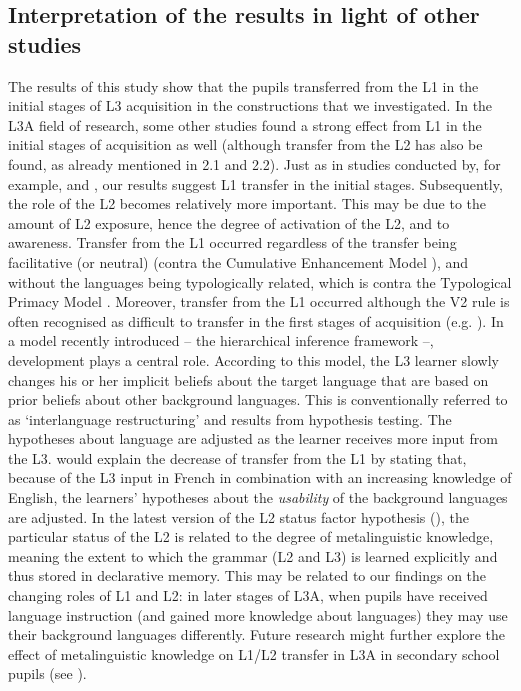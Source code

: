 \documentclass[output=paper,modfonts,nonflat, newtxmath]{langsci/langscibook}
\begin{document}
\subsection{{Interpretation} {of} {the} {results} {in} {light} {of} {other} {studies} }%
\label{sec:stadt:5.2}
The results of this study show that the pupils transferred from the L1 in the initial stages of L3 acquisition in the constructions that we investigated. In the L3A field of research, some other studies found a strong effect from L1 in the initial stages of acquisition as well (although transfer from the L2 has also be found, as already mentioned in 2.1 and 2.2). Just as in studies conducted by, for example, \citet{NaRanongLeung2009} and \citet{Hermas2010, Hermas2014Morphosyntax, Hermas2014Relatives}, our results suggest L1 transfer in the initial stages. Subsequently, the role of the L2 becomes relatively more important. This may be due to the amount of L2 exposure, hence the degree of activation of the L2, and to awareness.
Transfer from the L1 occurred regardless of the transfer being facilitative (or neutral) (contra the Cumulative Enhancement Model \citealt{FlynnEtAl2004}), and without the languages being typologically related, which is contra the Typological Primacy Model \citep{Rothman2010, Rothman2011, Rothman2015}. Moreover, transfer from the L1 occurred although the V2 rule is often recognised as difficult to transfer in the first stages of acquisition (e.g. \citealt{Pienemann1998}). In a model recently introduced – the hierarchical inference framework \citep{PajakEtAl2016} –, development plays a central role. According to this model, the L3 learner slowly changes his or her implicit beliefs about the target language that are based on prior beliefs about other background languages. This is conventionally referred to as ‘interlanguage restructuring’ and results from hypothesis testing. The hypotheses about language are adjusted as the learner receives more input from the L3. \citet{PajakEtAl2016} would explain the decrease of transfer from the L1 by stating that, because of the L3 input in French in combination with an increasing knowledge of English, the learners’ hypotheses about the \textit{usability} of the background languages are adjusted.
In the latest version of the L2 status factor hypothesis (\citealt{BardelSánchez2017}), the particular status of the L2 is related to the degree of metalinguistic knowledge, meaning the extent to which the grammar (L2 and L3) is learned explicitly and thus stored in declarative memory.\footnotemark{} This may be related to our findings on the changing roles of L1 and L2: in later stages of L3A, when pupils have received language instruction (and gained more knowledge about languages) they may use their background languages differently. Future research might further explore the effect of metalinguistic knowledge on L1/L2 transfer in L3A in secondary school pupils (see \citealt{FalkEtAl2015}).
\end{document}
